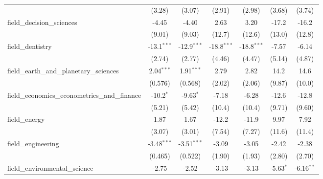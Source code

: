 \begin{tabular}{lcccccc}
                                                               & (3.28)         & (3.07)         & (2.91)        & (2.98)        & (3.68)        & (3.74)\\   
   field\_decision\_sciences                                   & -4.45          & -4.40          & 2.63          & 3.20          & -17.2         & -16.2\\   
                                                               & (9.01)         & (9.03)         & (12.7)        & (12.6)        & (13.0)        & (12.8)\\   
   field\_dentistry                                            & -13.1$^{***}$  & -12.9$^{***}$  & -18.8$^{***}$ & -18.8$^{***}$ & -7.57         & -6.14\\   
                                                               & (2.74)         & (2.77)         & (4.46)        & (4.47)        & (5.14)        & (4.87)\\   
   field\_earth\_and\_planetary\_sciences                      & 2.04$^{***}$   & 1.91$^{***}$   & 2.79          & 2.82          & 14.2          & 14.6\\   
                                                               & (0.576)        & (0.568)        & (2.02)        & (2.06)        & (9.87)        & (10.0)\\   
   field\_economics\_econometrics\_and\_finance                & -10.2$^{*}$    & -9.63$^{*}$    & -7.18         & -6.28         & -12.6         & -12.8\\   
                                                               & (5.21)         & (5.42)         & (10.4)        & (10.4)        & (9.71)        & (9.60)\\   
   field\_energy                                               & 1.87           & 1.67           & -12.2         & -11.9         & 9.97          & 7.92\\   
                                                               & (3.07)         & (3.01)         & (7.54)        & (7.27)        & (11.6)        & (11.4)\\   
   field\_engineering                                          & -3.48$^{***}$  & -3.51$^{***}$  & -3.09         & -3.05         & -2.42         & -2.38\\   
                                                               & (0.465)        & (0.522)        & (1.90)        & (1.93)        & (2.80)        & (2.70)\\   
   field\_environmental\_science                               & -2.75          & -2.52          & -3.13         & -3.13         & -5.63$^{*}$   & -6.16$^{**}$\\   

\end{tabular}
